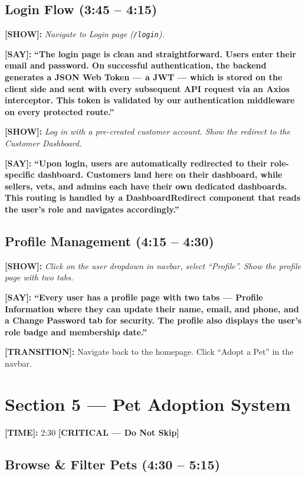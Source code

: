 \documentclass[12pt,a4paper]{article}
\newcommand{\say}[1]{\textbf{\textcolor{narration}{[SAY]:}} \textbf{``#1''}}
\newcommand{\show}[1]{\textbf{\textcolor{screen}{[SHOW]:}} \textit{#1}}
\newcommand{\timing}[1]{\textbf{\textcolor{timing}{[TIME]:}} #1}
\newcommand{\trans}[1]{\textbf{\textcolor{transition}{[TRANSITION]:}} #1}
\newcommand{\critical}{\textcolor{critical}{\textbf{[CRITICAL --- Do Not Skip]}}}
\begin{document}
\subsection{Login Flow (3:45 -- 4:15)}

\show{Navigate to Login page (\texttt{/login}).}

\say{The login page is clean and straightforward. Users enter their email and password. On successful authentication, the backend generates a JSON Web Token --- a JWT --- which is stored on the client side and sent with every subsequent API request via an Axios interceptor. This token is validated by our authentication middleware on every protected route.}

\show{Log in with a pre-created customer account. Show the redirect to the Customer Dashboard.}

\say{Upon login, users are automatically redirected to their role-specific dashboard. Customers land here on their dashboard, while sellers, vets, and admins each have their own dedicated dashboards. This routing is handled by a DashboardRedirect component that reads the user's role and navigates accordingly.}

\subsection{Profile Management (4:15 -- 4:30)}

\show{Click on the user dropdown in navbar, select ``Profile''. Show the profile page with two tabs.}

\say{Every user has a profile page with two tabs --- Profile Information where they can update their name, email, and phone, and a Change Password tab for security. The profile also displays the user's role badge and membership date.}

\trans{Navigate back to the homepage. Click ``Adopt a Pet'' in the navbar.}

\newpage

\section{Section 5 --- Pet Adoption System}
\label{sec:pets}

\timing{2:30} \hfill \critical

\subsection{Browse \& Filter Pets (4:30 -- 5:15)}
\end{document}
